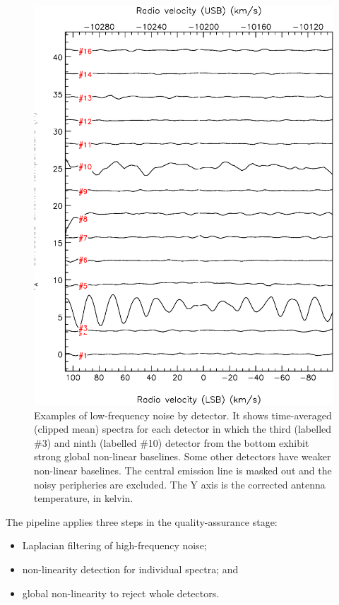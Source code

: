 \documentclass[a4paper,fleqn,usenatbib]{mnras}
\begin{document}
\begin{figure}
\includegraphics[width=\columnwidth]{receptors_nonlinearity}
\caption{Examples of low-frequency noise by detector.
  It shows time-averaged (clipped mean) spectra for each detector in
  which the third (labelled \#3) and ninth (labelled \#10) detector from the bottom
  exhibit strong global non-linear baselines.  Some other detectors
  have weaker non-linear baselines.  The central emission line
  is masked out and the noisy peripheries are excluded. The Y axis is
  the corrected  antenna temperature, in kelvin.}
\label{fig:badbase:interference_receptors}
\end{figure}

The pipeline applies three steps in the quality-assurance stage:
\begin{itemize}
\item Laplacian filtering of high-frequency noise;
\item non-linearity detection for individual spectra; and
\item global non-linearity to reject whole detectors.
\end{itemize}
\end{document}
